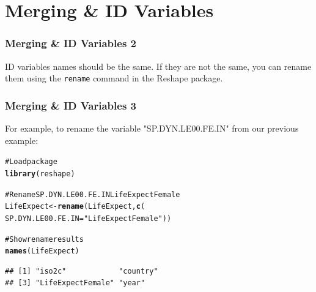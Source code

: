 \documentclass{beamer}\usepackage{graphicx, color}
\makeatletter
\newcommand{\hlfunctioncall}[1]{\textcolor[rgb]{0.501960784313725,0,0.329411764705882}{\textbf{#1}}}%
\newcommand{\hlstring}[1]{\textcolor[rgb]{0.6,0.6,1}{#1}}%
\newcommand{\hlcomment}[1]{\textcolor[rgb]{0.180392156862745,0.6,0.341176470588235}{#1}}%
\newenvironment{kframe}{%
 \def\at@end@of@kframe{}%
 \ifinner\ifhmode%
  \def\at@end@of@kframe{\end{minipage}}%
  \begin{minipage}{\columnwidth}%
 \fi\fi%
 \def\FrameCommand##1{\hskip\@totalleftmargin \hskip-\fboxsep
 \colorbox{shadecolor}{##1}\hskip-\fboxsep
     \hskip-\linewidth \hskip-\@totalleftmargin \hskip\columnwidth}%
 \MakeFramed {\advance\hsize-\width
   \@totalleftmargin\z@ \linewidth\hsize
   \@setminipage}}%
 {\par\unskip\endMakeFramed%
 \at@end@of@kframe}
\newenvironment{knitrout}{}{} %
\makeatother
\begin{document}

\section{Merging \& ID Variables}


\begin{frame}[fragile]
  \frametitle{Merging \& ID Variables 2}
  ID variables names should be the same. If they are not the same, you can rename them using the \texttt{rename} command in the Reshape package. \\[0.5cm]
\end{frame}

\begin{frame}[fragile]
  \frametitle{Merging \& ID Variables 3}
  For example, to rename the variable "SP.DYN.LE00.FE.IN" from our previous example:
\begin{knitrout}
\color{fgcolor}\begin{kframe}
\begin{alltt}
\hlcomment{# Load package}
\hlfunctioncall{library}(reshape)

\hlcomment{# Rename SP.DYN.LE00.FE.IN LifeExpectFemale}
LifeExpect <- \hlfunctioncall{rename}(LifeExpect, \hlfunctioncall{c}(
  SP.DYN.LE00.FE.IN = \hlstring{"LifeExpectFemale"}))

\hlcomment{# Show rename results}
\hlfunctioncall{names}(LifeExpect)
\end{alltt}
\begin{verbatim}
## [1] "iso2c"            "country"         
## [3] "LifeExpectFemale" "year"
\end{verbatim}
\end{kframe}
\end{knitrout}

\end{frame}
\end{document}
